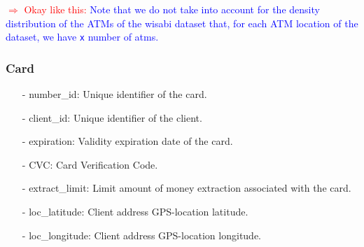 \documentclass{article}
\begin{document}
\begin{tcolorbox}
\textcolor{red}{$\Rightarrow$ Okay like this: }
\textcolor{blue}{Note that we do not take into account for the density distribution of the 
ATMs of the wisabi dataset that, for each ATM location of the dataset, we have \texttt{x} 
number of atms.}
\end{tcolorbox}

\subsubsection*{Card}

\begin{itemize}
\item[-] number\_id: Unique identifier of the card.
\item[-] client\_id: Unique identifier of the client.
\item[-] expiration: Validity expiration date of the card.
\item[-] CVC: Card Verification Code.
\item[-] extract\_limit: Limit amount of money extraction associated with the card.
\item[-] loc\_latitude: Client address GPS-location latitude.
\item[-] loc\_longitude: Client address GPS-location longitude.
\end{itemize}
\end{document}
